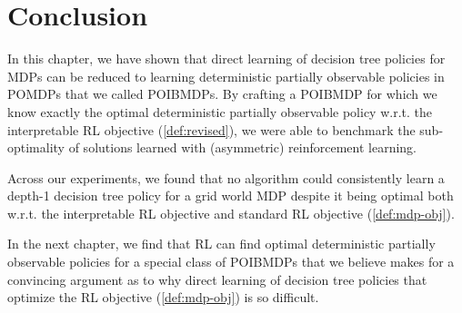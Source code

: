 \section{Conclusion}
In this chapter, we have shown that direct learning of decision tree policies for MDPs can be reduced to learning deterministic partially observable policies in POMDPs that we called POIBMDPs.
By crafting a POIBMDP for which we know exactly the optimal deterministic partially observable policy w.r.t. the interpretable RL objective (\ref{def:revised}), we were able to benchmark the sub-optimality of solutions learned with (asymmetric) reinforcement learning.

Across our experiments, we found that no algorithm could consistently learn a depth-1 decision tree policy for a grid world MDP despite it being optimal both w.r.t. the interpretable RL objective and standard RL objective (\ref{def:mdp-obj}).

In the next chapter, we find that RL can find optimal deterministic partially observable policies for a special class of POIBMDPs that we believe makes for a convincing argument as to why direct learning of decision tree policies that optimize the RL objective (\ref{def:mdp-obj}) is so difficult.
